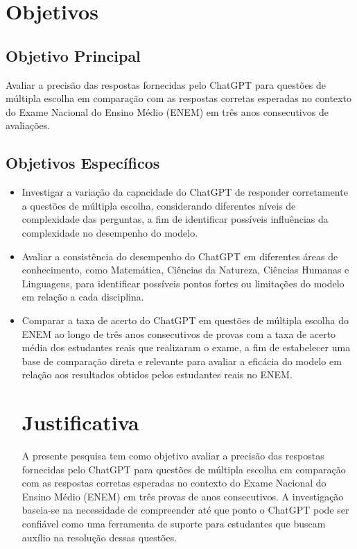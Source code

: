 \documentclass[12pt, a4paper]{article}
\begin{document}
\section{Objetivos}
\subsection{Objetivo Principal}
Avaliar a precisão das respostas fornecidas pelo ChatGPT para questões de múltipla escolha em comparação com as respostas corretas esperadas no contexto do Exame Nacional do Ensino Médio (ENEM) em três anos consecutivos de avaliações.

\subsection{Objetivos Específicos}
\begin{itemize}
    \item Investigar a variação da capacidade do ChatGPT de responder corretamente a questões de múltipla escolha, considerando diferentes níveis de complexidade das perguntas, a fim de identificar possíveis influências da complexidade no desempenho do modelo.
    \item Avaliar a consistência do desempenho do ChatGPT em diferentes áreas de conhecimento, como Matemática, Ciências da Natureza, Ciências Humanas e Linguagens, para identificar possíveis pontos fortes ou limitações do modelo em relação a cada disciplina.
    \item Comparar a taxa de acerto do ChatGPT em questões de múltipla escolha do ENEM ao longo de três anos consecutivos de provas com a taxa de acerto média dos estudantes reais que realizaram o exame, a fim de estabelecer uma base de comparação direta e relevante para avaliar a eficácia do modelo em relação aos resultados obtidos pelos estudantes reais no ENEM.

\section{Justificativa}

A presente pesquisa tem como objetivo avaliar a precisão das respostas fornecidas pelo ChatGPT para questões de múltipla escolha em comparação com as respostas corretas esperadas no contexto do Exame Nacional do Ensino Médio (ENEM) em três provas de anos consecutivos. A investigação baseia-se na necessidade de compreender até que ponto o ChatGPT pode ser confiável como uma ferramenta de suporte para estudantes que buscam auxílio na resolução dessas questões.


\end{itemize}
\end{document}
